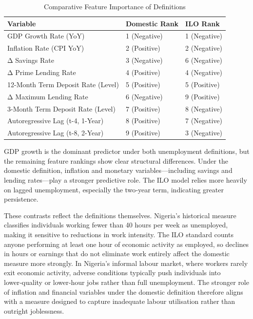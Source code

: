 \documentclass[
  letterpaper,
  DIV=11,
  numbers=noendperiod]{scrartcl}
\begin{document}
{

\begin{longtable}[]{@{}lll@{}}

\caption{\label{tbl-ft_importance-comp}Comparative Feature Importance of
Definitions}

\tabularnewline

\toprule\noalign{}
Variable & Domestic Rank & ILO Rank \\
\midrule\noalign{}
\endhead
\bottomrule\noalign{}
\endlastfoot
GDP Growth Rate (YoY) & 1 (Negative) & 1 (Negative) \\
Inflation Rate (CPI YoY) & 2 (Positive) & 2 (Negative) \\
Δ Savings Rate & 3 (Negative) & 6 (Negative) \\
Δ Prime Lending Rate & 4 (Positive) & 4 (Negative) \\
12-Month Term Deposit Rate (Level) & 5 (Positive) & 5 (Positive) \\
Δ Maximum Lending Rate & 6 (Negative) & 9 (Positive) \\
3-Month Term Deposit Rate (Level) & 7 (Positive) & 8 (Negative) \\
Autoregressive Lag (t-4, 1-Year) & 8 (Positive) & 7 (Negative) \\
Autoregressive Lag (t-8, 2-Year) & 9 (Positive) & 3 (Negative) \\

\end{longtable}

}

GDP growth is the dominant predictor under both unemployment
definitions, but the remaining feature rankings show clear structural
differences. Under the domestic definition, inflation and monetary
variables---including savings and lending rates---play a stronger
predictive role. The ILO model relies more heavily on lagged
unemployment, especially the two‑year term, indicating greater
persistence.

These contrasts reflect the definitions themselves. Nigeria's historical
measure classifies individuals working fewer than 40 hours per week as
unemployed, making it sensitive to reductions in work intensity. The ILO
standard counts anyone performing at least one hour of economic activity
as employed, so declines in hours or earnings that do not eliminate work
entirely affect the domestic measure more strongly. In Nigeria's
informal labour market, where workers rarely exit economic activity,
adverse conditions typically push individuals into lower‑quality or
lower‑hour jobs rather than full unemployment. The stronger role of
inflation and financial variables under the domestic definition
therefore aligns with a measure designed to capture inadequate labour
utilisation rather than outright joblessness.
\end{document}
